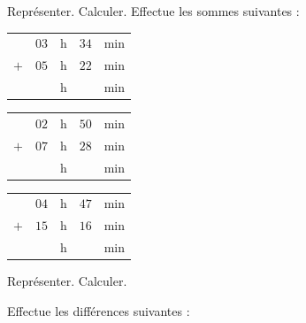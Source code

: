 \begin{pageAD}




\begin{ExoCad}{Représenter. Calculer.}
 Effectue les sommes suivantes :
 
\begin{minipage}{0.30\linewidth}
\begin{tabular}{ccccc} 
& $03$ & h &  $34$ & min \\ 
$+$   & $05$ & h & $22$  & min\\ 
\hline 
   &  & h & & min\\
\end{tabular} 
\end{minipage}
\hfill 
\begin{minipage}{0.30\linewidth}
 \begin{tabular}{ccccc} 
& $02$ & h &  $50$ & min \\ 
$+$   & $07$ & h &  $28$ & min\\ 
\hline 
   &  & h & & min\\
\end{tabular} 
\end{minipage}
\hfill 
\begin{minipage}{0.30\linewidth}
 \begin{tabular}{ccccc} 
& $04$ & h & $47$  & min \\ 
$+$   & $15$ & h & $16$ & min\\ 
\hline 
   &  & h & & min\\
\end{tabular} 
\end{minipage}
 
\end{ExoCad}



\begin{ExoCad}{Représenter. Calculer.}

 Effectue les différences suivantes :
 

\end{ExoCad}
\end{pageAD}
